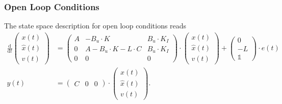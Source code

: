 \documentclass[a4paper,12 pt]{article}
\numberwithin{equation}{section}
\theoremstyle{definition}
\theoremstyle{remark}
\theoremstyle{definition}
\theoremstyle{definition}
\theoremstyle{definition}
\theoremstyle{remark}
\begin{document}
\subsubsection*{Open Loop Conditions}
The state space description for open loop conditions reads
\begin{equation}
\begin{split}
\frac{\text{d}}{\text{d}t}\begin{pmatrix}
x(t)\\
\hat{x}(t)\\
v(t)
\end{pmatrix}&=\begin{pmatrix}
A & -B_u\cdot K & B_u\cdot K_I\\
0&A-B_u\cdot K-L\cdot C & B_u\cdot K_I\\
0&0&0
\end{pmatrix}\cdot 
\begin{pmatrix}
x(t)\\
\hat{x}(t)\\
v(t)
\end{pmatrix} +\begin{pmatrix}
0\\ -L \\ \mathbb{1}
\end{pmatrix}\cdot e(t)\\
y(t)&=\begin{pmatrix} C & 0 &0 \end{pmatrix} \cdot \begin{pmatrix}
x(t)\\
\hat{x}(t)\\
v(t)
\end{pmatrix}.
\end{split}
\end{equation}
\end{document}
